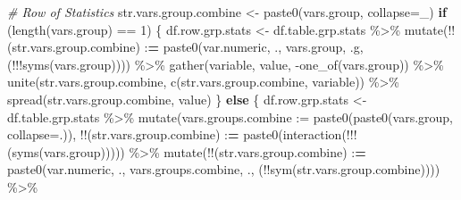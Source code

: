 \documentclass[
]{book}
\newenvironment{Shaded}{\begin{snugshade}}{\end{snugshade}}
\newcommand{\AttributeTok}[1]{\textcolor[rgb]{0.77,0.63,0.00}{#1}}
\newcommand{\CommentTok}[1]{\textcolor[rgb]{0.56,0.35,0.01}{\textit{#1}}}
\newcommand{\ControlFlowTok}[1]{\textcolor[rgb]{0.13,0.29,0.53}{\textbf{#1}}}
\newcommand{\DecValTok}[1]{\textcolor[rgb]{0.00,0.00,0.81}{#1}}
\newcommand{\ErrorTok}[1]{\textcolor[rgb]{0.64,0.00,0.00}{\textbf{#1}}}
\newcommand{\FunctionTok}[1]{\textcolor[rgb]{0.00,0.00,0.00}{#1}}
\newcommand{\NormalTok}[1]{#1}
\newcommand{\OtherTok}[1]{\textcolor[rgb]{0.56,0.35,0.01}{#1}}
\newcommand{\SpecialCharTok}[1]{\textcolor[rgb]{0.00,0.00,0.00}{#1}}
\newcommand{\StringTok}[1]{\textcolor[rgb]{0.31,0.60,0.02}{#1}}
\begin{document}
\begin{Shaded}
\begin{Highlighting}[]
  
  \CommentTok{\# Row of Statistics}
\NormalTok{  str.vars.group.combine }\OtherTok{\textless{}{-}} \FunctionTok{paste0}\NormalTok{(vars.group, }\AttributeTok{collapse=}\StringTok{\textquotesingle{}\_\textquotesingle{}}\NormalTok{)}
  \ControlFlowTok{if}\NormalTok{ (}\FunctionTok{length}\NormalTok{(vars.group) }\SpecialCharTok{==} \DecValTok{1}\NormalTok{) \{}
\NormalTok{    df.row.grp.stats }\OtherTok{\textless{}{-}}\NormalTok{ df.table.grp.stats }\SpecialCharTok{\%\textgreater{}\%}
      \FunctionTok{mutate}\NormalTok{(}\SpecialCharTok{!!}\NormalTok{(str.vars.group.combine) }\SpecialCharTok{:}\ErrorTok{=} 
               \FunctionTok{paste0}\NormalTok{(var.numeric, }\StringTok{\textquotesingle{}.\textquotesingle{}}\NormalTok{,}
\NormalTok{                      vars.group, }\StringTok{\textquotesingle{}.g\textquotesingle{}}\NormalTok{,}
\NormalTok{                      (}\SpecialCharTok{!!!}\FunctionTok{syms}\NormalTok{(vars.group)))) }\SpecialCharTok{\%\textgreater{}\%}
      \FunctionTok{gather}\NormalTok{(variable, value, }\SpecialCharTok{{-}}\FunctionTok{one\_of}\NormalTok{(vars.group)) }\SpecialCharTok{\%\textgreater{}\%}
      \FunctionTok{unite}\NormalTok{(str.vars.group.combine, }\FunctionTok{c}\NormalTok{(str.vars.group.combine, }\StringTok{\textquotesingle{}variable\textquotesingle{}}\NormalTok{)) }\SpecialCharTok{\%\textgreater{}\%}
      \FunctionTok{spread}\NormalTok{(str.vars.group.combine, value)}
\NormalTok{  \} }\ControlFlowTok{else}\NormalTok{ \{}
\NormalTok{    df.row.grp.stats }\OtherTok{\textless{}{-}}\NormalTok{ df.table.grp.stats }\SpecialCharTok{\%\textgreater{}\%} 
      \FunctionTok{mutate}\NormalTok{(}\AttributeTok{vars.groups.combine :=} 
               \FunctionTok{paste0}\NormalTok{(}\FunctionTok{paste0}\NormalTok{(vars.group, }\AttributeTok{collapse=}\StringTok{\textquotesingle{}.\textquotesingle{}}\NormalTok{)),}
             \SpecialCharTok{!!}\NormalTok{(str.vars.group.combine) }\SpecialCharTok{:}\ErrorTok{=} 
               \FunctionTok{paste0}\NormalTok{(}\FunctionTok{interaction}\NormalTok{(}\SpecialCharTok{!!!}\NormalTok{(}\FunctionTok{syms}\NormalTok{(vars.group))))) }\SpecialCharTok{\%\textgreater{}\%}
      \FunctionTok{mutate}\NormalTok{(}\SpecialCharTok{!!}\NormalTok{(str.vars.group.combine) }\SpecialCharTok{:}\ErrorTok{=} 
               \FunctionTok{paste0}\NormalTok{(var.numeric, }\StringTok{\textquotesingle{}.\textquotesingle{}}\NormalTok{, vars.groups.combine, }\StringTok{\textquotesingle{}.\textquotesingle{}}\NormalTok{,}
\NormalTok{                      (}\SpecialCharTok{!!}\FunctionTok{sym}\NormalTok{(str.vars.group.combine)))) }\SpecialCharTok{\%\textgreater{}\%}

\end{Highlighting}
\end{Shaded}
\end{document}
